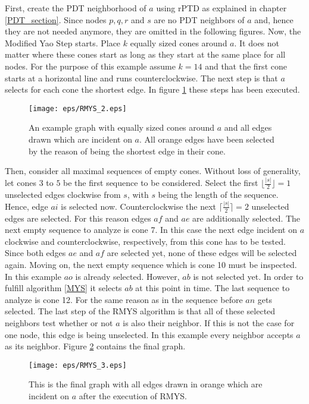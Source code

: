 First, create the PDT neighborhood of $a $ using rPTD as explained in chapter \ref{PDT_section}.
Since nodes $p, q, r $ and $s $ are no PDT neighbors of $a $ and, hence they are not needed anymore, they are omitted in the following figures.
Now, the Modified Yao Step starts.
Place $k $ equally sized cones around $a $.
It does not matter where these cones start as long as they start at the same place for all nodes.
For the purpose of this example assume $k=14 $ and that the first cone starts at a horizontal line and runs counterclockwise.
The next step is that $a $ selects for each cone the shortest edge.
In figure \ref{fig:RMYS_2} these steps has been executed.
\begin{figure}[h!]
\centering
\texttt{[image: eps/RMYS\_2.eps]}
\caption{An example graph with equally sized cones around $a $ and all edges drawn which are incident on $a $. All orange edges have been selected by the reason of being the shortest edge in their cone.}
\label{fig:RMYS_2}
\end{figure}
Then, consider all maximal sequences of empty cones.
Without loss of generality, let cones $3 $ to $5 $ be the first sequence to be considered.
Select the first $\lfloor \frac{|s|}{2} \rfloor = 1 $ unselected edges clockwise from $s $, with $s $ being the length of the sequence.
Hence, edge $ai $ is selected now.
Counterclockwise the next $\lceil \frac{|s|}{2} \rceil = 2$ unselected edges are selected.
For this reason edges $af $ and $ae $ are additionally selected.
The next empty sequence to analyze is cone 7.
In this case the next edge incident on $a $ clockwise and counterclockwise, respectively, from this cone has to be tested.
Since both edges $ae $ and $af $ are selected yet, none of these edges will be selected again.
Moving on, the next empty sequence which is cone 10 must be inspected.
In this example $ao $ is already selected. 
However, $ab $ is not selected yet.
In order to fulfill algorithm \ref{MYS} it selects $ab $ at this point in time.
The last sequence to analyze is cone 12.
For the same reason as in the sequence before $an $ gets selected.
The last step of the RMYS algorithm is that all of these selected neighbors test whether or not $a $ is also their neighbor.
If this is not the case for one node, this edge is being unselected.
In this example every neighbor accepts $a $ as its neighbor.
Figure \ref{fig:RMYS_3} contains the final graph.

\begin{figure}[h!]
\centering
\texttt{[image: eps/RMYS\_3.eps]}
\caption{This is the final graph with all edges drawn in orange which are incident on $a $ after the execution of RMYS.}
\label{fig:RMYS_3}
\end{figure}




